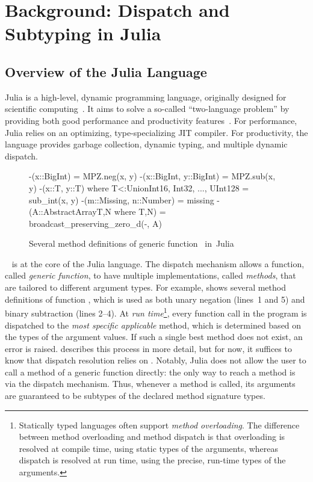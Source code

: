 \chapter{Background: Dispatch and Subtyping in Julia}\label{chap:2}

\section{Overview of the Julia Language}

Julia is a high-level, dynamic programming language, originally designed 
for scientific computing~\cite{bezanson:julia-fresh:2017}.
It aims to solve a so-called ``two-language problem''
by providing both good performance and productivity features~\cite{oopsla18a}.
For performance, Julia relies on an optimizing, type-specializing JIT compiler.
For productivity, the language provides garbage collection, dynamic typing, and
multiple dynamic dispatch.

\begin{figure}[t]
\begin{julia}
-(x::BigInt) = MPZ.neg(x, y)
-(x::BigInt, y::BigInt) = MPZ.sub(x, y)
-(x::T, y::T) where T<:Union{Int16, Int32, ..., UInt128} = sub_int(x, y)
-(m::Missing, n::Number) = missing
-(A::AbstractArray{T,N} where {T,N}) = broadcast_preserving_zero_d(-, A)
\end{julia}
\caption{Several method definitions of generic function~\cjl{(-)}
in~Julia}\label{fig:code:subtraction}
\end{figure}

~\cite{bobrow:common-loops:1986,%
chambers:multi-cecil:1992} is at the core of the Julia language.
The dispatch mechanism allows a function, called \emph{generic
function}, to have multiple implementations, called \emph{methods}, that are
tailored to different argument types. For example, 
shows several method definitions of function \cjl{(-)},
which is used as both unary negation (lines~1 and 5)
and binary subtraction (lines 2--4).
At \emph{run time}\footnote{Statically typed languages often support
\emph{method overloading}. The difference between method overloading and method
dispatch is that overloading is resolved at compile time, using static types of
the arguments, whereas dispatch is resolved at run time, using the precise,
run-time types of the arguments.},
every function call in the program is dispatched to the
\emph{most specific applicable} method, which is determined based on the
types of the argument values. If such a single best method does not exist,
an error is raised.
 describes this process in more detail, but for now,
it suffices to know that dispatch resolution relies on .
Notably, Julia does not allow the user to call a method of a generic function
directly: the only way to reach a method is via the dispatch mechanism.
Thus, whenever a method is called, its arguments are guaranteed to be
subtypes of the declared method signature types.

